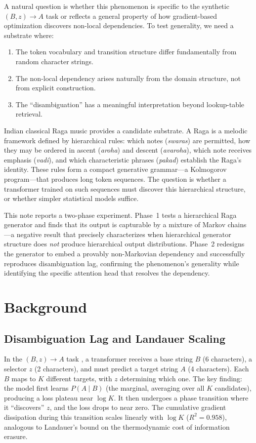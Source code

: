 \documentclass[11pt,a4paper]{article}
\begin{document}
A natural question is whether this phenomenon is specific to the synthetic $(B, z) \to A$ task or reflects a general property of how gradient-based optimization discovers non-local dependencies. To test generality, we need a substrate where:
\begin{enumerate}[nosep]
    \item The token vocabulary and transition structure differ fundamentally from random character strings.
    \item The non-local dependency arises naturally from the domain structure, not from explicit construction.
    \item The ``disambiguation'' has a meaningful interpretation beyond lookup-table retrieval.
\end{enumerate}

Indian classical Raga music provides a candidate substrate. A Raga is a melodic framework defined by hierarchical rules: which notes (\emph{swaras}) are permitted, how they may be ordered in ascent (\emph{aroha}) and descent (\emph{avaroha}), which note receives emphasis (\emph{vadi}), and which characteristic phrases (\emph{pakad}) establish the Raga's identity. These rules form a compact generative grammar---a Kolmogorov program---that produces long token sequences. The question is whether a transformer trained on such sequences must discover this hierarchical structure, or whether simpler statistical models suffice.

This note reports a two-phase experiment. Phase~1 tests a hierarchical Raga generator and finds that its output is capturable by a mixture of Markov chains---a negative result that precisely characterizes when hierarchical generator structure does \emph{not} produce hierarchical output distributions. Phase~2 redesigns the generator to embed a provably non-Markovian dependency and successfully reproduces disambiguation lag, confirming the phenomenon's generality while identifying the specific attention head that resolves the dependency.

\section{Background}

\subsection{Disambiguation Lag and Landauer Scaling}

In the $(B, z) \to A$ task \citep{sahasrabudhe2026late}, a transformer receives a base string $B$ (6 characters), a selector $z$ (2 characters), and must predict a target string $A$ (4 characters). Each $B$ maps to $K$ different targets, with $z$ determining which one. The key finding: the model first learns $P(A \mid B)$ (the marginal, averaging over all $K$ candidates), producing a loss plateau near $\log K$. It then undergoes a phase transition where it ``discovers'' $z$, and the loss drops to near zero. The cumulative gradient dissipation during this transition scales linearly with $\log K$ ($R^2 = 0.958$), analogous to Landauer's bound on the thermodynamic cost of information erasure.
\end{document}
